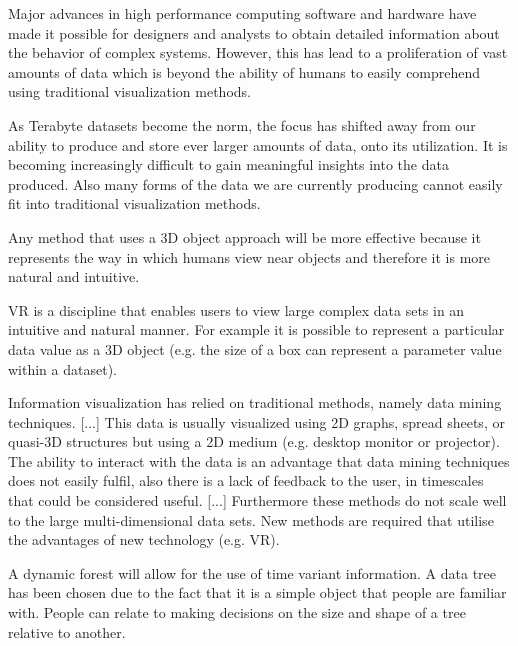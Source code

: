 Major advances in high performance computing software and hardware have made it possible for designers and analysts to obtain detailed information about the behavior of complex systems. However, this has lead to a proliferation of vast amounts of data which is beyond the ability of humans to easily comprehend using traditional visualization methods.
\cite{Sarathy2000}

As Terabyte datasets become the norm, the focus has shifted away from our ability to produce and store ever larger amounts of data, onto its utilization. It is becoming increasingly difficult to gain meaningful insights into the data produced. Also many forms of the data we are currently producing cannot easily fit into traditional visualization methods.
\cite{Jamieson2007}

Any method that uses a 3D object approach will be more effective because it represents the way in which humans view near objects and therefore it is more natural and intuitive.
\cite{Jamieson2007}

VR is a discipline that enables users to view large complex data sets in an intuitive and natural manner. For example it is possible to represent a particular data value as a 3D object (e.g. the size of a box can represent a parameter value within a dataset).
\cite{Jamieson2007}

Information visualization has relied on traditional methods, namely data mining techniques. [...] This data is usually visualized using 2D graphs, spread sheets, or quasi-3D structures but using a 2D medium (e.g. desktop monitor or projector). The ability to interact with the data is an advantage that data mining techniques does not easily fulfil, also there is a lack of feedback to the user, in timescales that could be considered useful. [...] Furthermore these methods do not scale well to the large multi-dimensional data sets. New methods are required that utilise the advantages of new technology (e.g. VR).
\cite{Jamieson2007}

A dynamic forest will allow for the use of time variant information. A data tree has been chosen due to the fact that it is a simple object that people are familiar with. People can relate to making decisions on the size and shape of a tree relative to another.
\cite{Jamieson2007}

